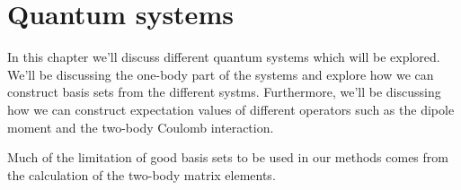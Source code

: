 \chapter{Quantum systems}
    In this chapter we'll discuss different quantum systems which will be
    explored. We'll be discussing the one-body part of the systems and explore
    how we can construct basis sets from the different systms. Furthermore,
    we'll be discussing how we can construct expectation values of different
    operators such as the dipole moment and the two-body Coulomb interaction.

    Much of the limitation of good basis sets to be used in our methods comes
    from the calculation of the two-body matrix elements.

    
